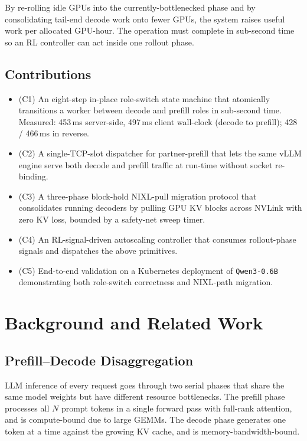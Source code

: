 \documentclass[10pt,twocolumn,letterpaper]{article}
\begin{document}
By re-rolling idle GPUs into the currently-bottlenecked phase and by consolidating tail-end decode work onto fewer GPUs, the system raises useful work per allocated GPU-hour. The operation must complete in sub-second time so an RL controller can act inside one rollout phase.


\subsection{Contributions}
\label{sec:contributions}

\begin{itemize}[nosep]
\item (C1) An eight-step in-place role-switch state machine that atomically transitions a worker between decode and prefill roles in sub-second time. Measured: 453\,ms server-side, 497\,ms client wall-clock (decode to prefill); 428 / 466\,ms in reverse.
\item (C2) A single-TCP-slot dispatcher for partner-prefill that lets the same vLLM engine serve both decode and prefill traffic at run-time without socket re-binding.
\item (C3) A three-phase block-hold NIXL-pull migration protocol that consolidates running decoders by pulling GPU KV blocks across NVLink with zero KV loss, bounded by a safety-net sweep timer.
\item (C4) An RL-signal-driven autoscaling controller that consumes rollout-phase signals and dispatches the above primitives.
\item (C5) End-to-end validation on a Kubernetes deployment of \texttt{Qwen3-0.6B} demonstrating both role-switch correctness and NIXL-path migration.
\end{itemize}

\section{Background and Related Work}
\label{sec:background}

\subsection{Prefill--Decode Disaggregation}
\label{sec:pd-disagg}

LLM inference of every request goes through two serial phases that share the same model weights but have different resource bottlenecks. The prefill phase processes all $N$ prompt tokens in a single forward pass with full-rank attention, and is compute-bound due to large GEMMs. The decode phase generates one token at a time against the growing KV cache, and is memory-bandwidth-bound.
\end{document}
